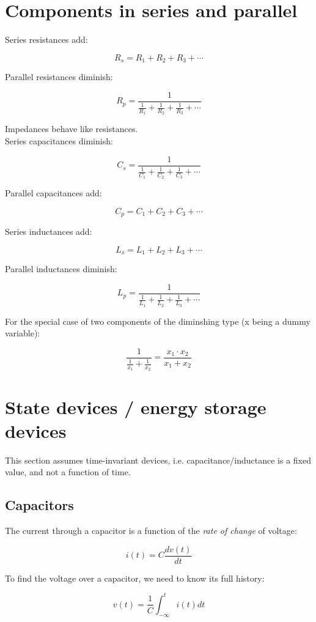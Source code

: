 \section{Components in series and parallel}

Series resistances add:

\[ R_s = R_1 + R_2 + R_3 + \cdots \]

Parallel resistances diminish:

\[ R_p = \frac{1}{ \frac{1}{R_1} + \frac{1}{R_2} + \frac{1}{R_3} + \cdots} \]

Impedances behave like resistances.\\

Series capacitances diminish:

\[ C_s = \frac{1}{ \frac{1}{C_1} + \frac{1}{C_2} + \frac{1}{C_3} + \cdots} \]

Parallel capacitances add:

\[ C_p = C_1 + C_2 + C_3 + \cdots \]

Series inductances add:

\[ L_s = L_1 + L_2 + L_3 + \cdots \]

Parallel inductances diminish:

\[ L_p = \frac{1}{ \frac{1}{L_1} + \frac{1}{L_2} + \frac{1}{L_3} + \cdots} \]

For the special case of two components of the diminshing type (x being a dummy variable):

\[ \frac{1}{ \frac{1}{x_1} + \frac{1}{x_2} } = \frac{x_1 \cdot x_2}{x_1 + x_2} \]

\section{State devices / energy storage devices}
This section assumes time-invariant devices, i.e. capacitance/inductance is a fixed value, and not a function of time.

\subsection{Capacitors}

The current through a capacitor is a function of the \emph{rate of change} of voltage:

\[ i(t) = C \frac{dv(t)}{dt} \]

To find the voltage over a capacitor, we need to know its full history:

\[ v(t) = \frac{1}{C} \int_{-\infty}^{t} i(t) dt \]

